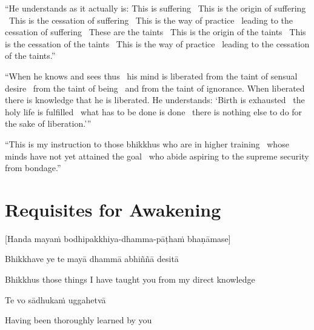 \begin{justify}
“He understands as it actually is: This is suffering \breathmark\ This is the origin of suffering \breathmark\ This is the cessation of suffering \breathmark\ This is the way of practice \breathmark\ leading to the cessation of suffering \breathmark\ These are the taints \breathmark\ This is the origin of the taints \breathmark\ This is the cessation of the taints \breathmark\ This is the way of practice \breathmark\ leading to the cessation of the taints.”
\end{justify}

\begin{justify}
“When he knows and sees thus \breathmark\ his mind is liberated from the taint of sensual desire \breathmark\ from the taint of being \breathmark\ and from the taint of ignorance. When liberated there is knowledge that he is liberated. He understands: ‘Birth is exhausted \breathmark\ the holy life is fulfilled \breathmark\ what has to be done is done \breathmark\ there is nothing else to do for the sake of liberation.’”
\end{justify}

\suttaRef{[MN 39]}

\begin{justify}
“This is my instruction to those bhikkhus who are in higher training \breathmark\ whose minds have not yet attained the goal \breathmark\ who abide aspiring to the supreme security from bondage.”
\end{justify}

\suttaRef{[MN 107]}
\clearpage

\section{Requisites for Awakening}
\label{requisites-for-awakening}

\begin{center}
  [Handa mayaṁ bodhipakkhiya-dhamma-pāṭhaṁ bhaṇāmase]
\end{center}

Bhikkhave ye te mayā dhammā abhiññā desitā

\begin{cprenglish}
  Bhikkhus those things I have taught you from my direct knowledge
\end{cprenglish}

Te vo sādhukaṁ uggahetvā

\begin{cprenglish}
  Having been thoroughly learned by you
\end{cprenglish}

